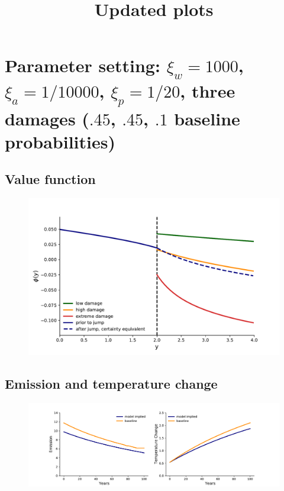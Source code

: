 \documentclass[11pt]{article}
\title{Updated plots}
\begin{document}
\maketitle
 
\section{Parameter setting: $\xi_w=1000$, $\xi_a=1/10000$, $\xi_p=1/20$, three damages ($.45$, $.45$, $.1$ baseline probabilities)}

\subsection{Value function}
\begin{figure}[H]
		\center
		\includegraphics[height=.35\textheight]{value.pdf}
\end{figure}

\subsection{Emission and temperature change}
\begin{figure}[H]
		\center
		\includegraphics[height=.25\textheight]{emission_temperature.pdf}
\end{figure}
\end{document}
